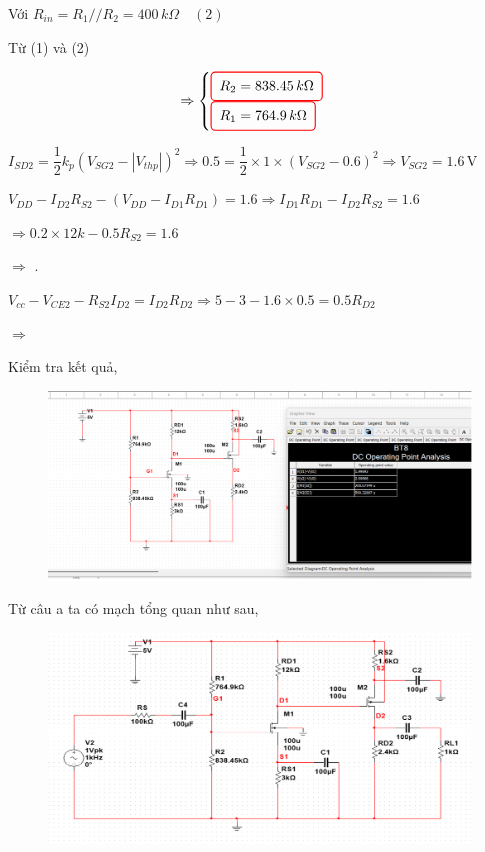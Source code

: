 	Với \( R_{in} = R_1 // R_2 = 400\,k\Omega \quad (2) \)
	
	Từ (1) và (2) 
	
	\[\Rightarrow 
	\begin{cases}
		\finalresult{R_2 = 838.45\,k\Omega} \\
		\finalresult{R_1 = 764.9\,k\Omega}
	\end{cases}
	\]


	\( I_{SD2} = \dfrac{1}{2} k_p (V_{SG2} - |V_{thp}|)^2 
	\Rightarrow 0.5 = \dfrac{1}{2}\times 1 \times (V_{SG2} - 0.6)^2 
	\Rightarrow V_{SG2} = 1.6\,\text{V} \)
	
	\( V_{DD} - I_{D2} R_{S2} - (V_{DD} - I_{D1} R_{D1}) = 1.6 
	\Rightarrow I_{D1} R_{D1} - I_{D2} R_{S2} = 1.6 \)
	
	\( \Rightarrow 0.2 \times 12k - 0.5 R_{S2} = 1.6 \)
	
	$\Rightarrow $ .
	
	$V_{cc} - V_{CE2} - R_{S2}I_{D2} = I_{D2}R_{D2} \Rightarrow 5 - 3 - 1.6\times 0.5 = 0.5R_{D2}$
	
	$\Rightarrow$ 

\noindent Kiểm tra kết quả,

\begin{figure}[H]
	\centering
	\includegraphics[width=.9\linewidth]{./my-chapters/my-images/Question8/a_dc_phancuc.png}	
\end{figure}

Từ câu a ta có mạch tổng quan như sau,

\begin{figure}[H]
	\centering
	\includegraphics[width=.8\linewidth]{./my-chapters/my-images/Question8/b_tongquan.png}
\end{figure}

